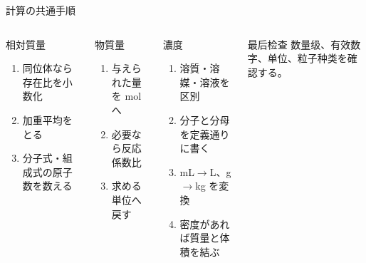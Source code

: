 \documentclass[notheorems,aspectratio=169]{beamer}
\begin{document}
\begin{frame}{計算の共通手順}
  \begin{columns}[T,onlytextwidth]
    \begin{block}{相対質量}
      \begin{enumerate}
        \item 同位体なら存在比を小数化
        \item 加重平均をとる
        \item 分子式・組成式の原子数を数える
      \end{enumerate}
    \end{block}
    \begin{block}{物質量}
      \begin{enumerate}
        \item 与えられた量を mol へ
        \item 必要なら反応係数比
        \item 求める単位へ戻す
      \end{enumerate}
    \end{block}
    \begin{exampleblock}{濃度}
      \begin{enumerate}
        \item 溶質・溶媒・溶液を区別
        \item 分子と分母を定義通りに書く
        \item mL$\to$L、g$\to$kg を変換
        \item 密度があれば質量と体積を結ぶ
      \end{enumerate}
    \end{exampleblock}
    \begin{alertblock}{最后检查}
      数量级、有效数字、单位、粒子种类を確認する。
    \end{alertblock}
  \end{columns}
\end{frame}
\end{document}
